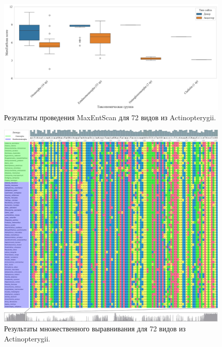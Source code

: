 \newpage
\begin{figure}[h] %
    \centering
    \includegraphics[width=1.0\textwidth]{images/Actinopterygii_maxentscan}
    \caption{Результаты проведения MaxEntScan для 72 видов из Actinopterygii.}
    \label{fig:Actinopterygii_maxentscan}
\end{figure}

\newpage
\begin{figure}[h] %
    \centering
    \includegraphics[width=1.0\textwidth]{images/Actinopterygii_alignment_ruler}
    \caption{Результаты множественного выравнивания для 72 видов из Actinopterygii.}
    \label{fig:Actinopterygii_alignment_ruler}
\end{figure}